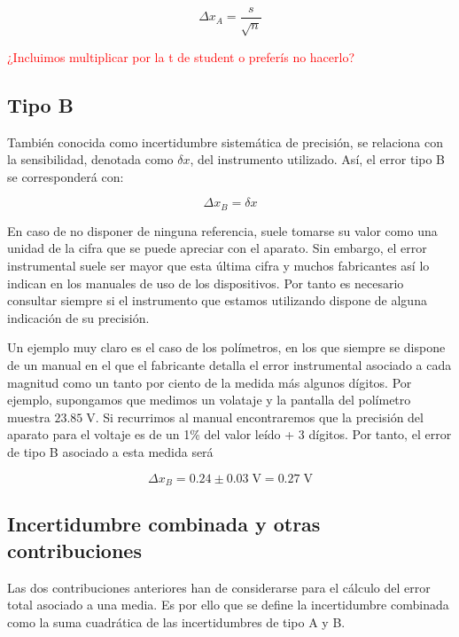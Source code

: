 \documentclass{book}
\begin{document}
\begin{equation}
  \Delta x_A = \frac{s}{\sqrt{n}}
\end{equation}

\textcolor{red}{¿Incluimos multiplicar por la t de student o preferís no hacerlo?}

\subsection{Tipo B}
También conocida como incertidumbre sistemática de precisión, se relaciona con la sensibilidad,
denotada como $\delta x$, del instrumento utilizado. Así, el error tipo B se corresponderá con:

\begin{equation}
  \Delta x_B = \delta x
\end{equation}

En caso de no disponer de ninguna referencia, suele tomarse su valor como una unidad de la cifra 
que se puede apreciar con el aparato. Sin embargo, el error instrumental suele ser mayor que esta 
última cifra y muchos fabricantes así lo indican en los manuales de uso de los dispositivos. Por 
tanto es necesario consultar siempre si el instrumento que estamos utilizando dispone de alguna 
indicación de su precisión.

Un ejemplo muy claro es el caso de los polímetros, en los que siempre se dispone de un manual en
el que el fabricante detalla el error instrumental asociado a cada magnitud como un tanto por
ciento de la medida más algunos dígitos. Por ejemplo, supongamos que medimos un volataje y
la pantalla del polímetro muestra $23.85 \; \textrm{V}$. Si recurrimos al manual encontraremos que la precisión
del aparato para el voltaje es de un 1\% del valor leído + 3 dígitos. Por tanto, el error de tipo
B asociado a esta medida será

\begin{equation}
  \Delta x_B = 0.24 \pm 0.03 \; \textrm{V} = 0.27 \; \textrm{V}
\end{equation}

\subsection{Incertidumbre combinada y otras contribuciones}

Las dos contribuciones anteriores han de considerarse para el cálculo del error total asociado a
una media. Es por ello que se define la incertidumbre combinada como la suma cuadrática de las
incertidumbres de tipo A y B.
\end{document}
